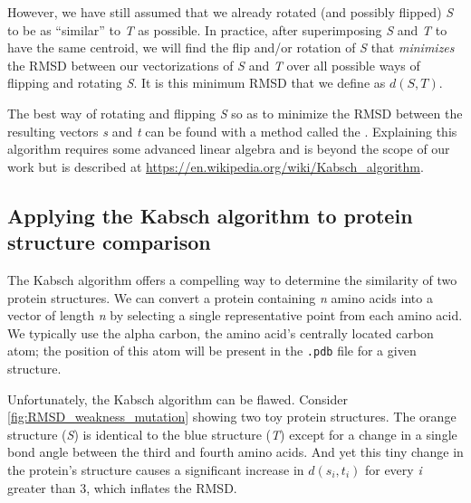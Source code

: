 However, we have still assumed that we already rotated (and possibly flipped) \textit{S} to be as ``similar'' to \textit{T} as possible. In practice, after superimposing \textit{S} and \textit{T} to have the same centroid, we will find the flip and/or rotation of \textit{S} that \textit{minimizes} the RMSD between our vectorizations of \textit{S} and \textit{T} over all possible ways of flipping and rotating \textit{S}. It is this minimum RMSD that we define as $d(S, T)$.

The best way of rotating and flipping \textit{S} so as to minimize the RMSD between the resulting vectors \textit{s} and \textit{t} can be found with a method called the . Explaining this algorithm requires some advanced linear algebra and is beyond the scope of our work but is described at \url{https://en.wikipedia.org/wiki/Kabsch_algorithm}.

\FloatBarrier
{}
\subsection{Applying the Kabsch algorithm to protein structure comparison}

The Kabsch algorithm offers a compelling way to determine the similarity of two protein structures. We can convert a protein containing \textit{n} amino acids into a vector of length \textit{n} by selecting a single representative point from each amino acid. We typically use the alpha carbon, the amino acid's centrally located carbon atom; the position of this atom will be present in the \texttt{.pdb} file for a given structure.

\begin{qbox}\end{qbox}

Unfortunately, the Kabsch algorithm can be flawed. Consider \autoref{fig:RMSD_weakness_mutation} showing two toy protein structures. The orange structure (\textit{S}) is identical to the blue structure (\textit{T}) except for a change in a single bond angle between the third and fourth amino acids. And yet this tiny change in the protein's structure causes a significant increase in $d(s_{i}, t_{i})$ for every \textit{i} greater than 3, which inflates the RMSD.

